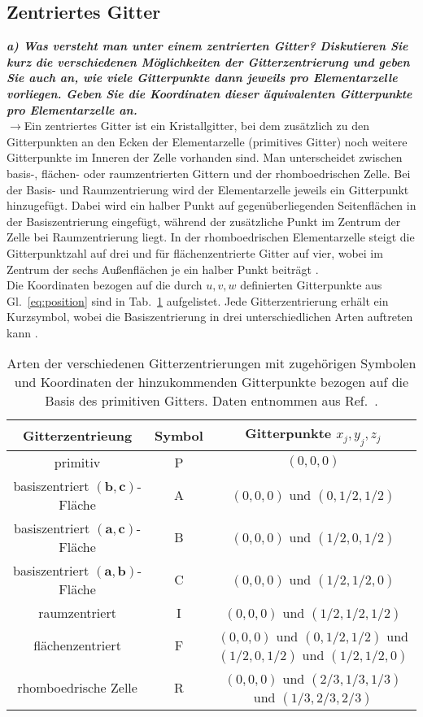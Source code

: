 \subsection{\label{subsec:FZV6}Zentriertes Gitter}
\textbf{\textit{a) Was versteht man unter einem zentrierten Gitter? 
Diskutieren Sie kurz die verschiedenen Möglichkeiten der Gitterzentrierung 
und geben Sie auch an, wie viele Gitterpunkte dann jeweils pro Elementarzelle 
vorliegen. Geben Sie die Koordinaten dieser äquivalenten Gitterpunkte 
pro Elementarzelle an.}}\\
$\rightarrow$Ein zentriertes Gitter ist ein Kristallgitter, bei dem zusätzlich zu den Gitterpunkten an den Ecken 
der Elementarzelle (primitives Gitter) noch weitere Gitterpunkte im Inneren der Zelle vorhanden sind. 
Man unterscheidet zwischen basis-, flächen- oder raumzentrierten Gittern und der rhomboedrischen Zelle. 
Bei der Basis- und Raumzentrierung wird der Elementarzelle jeweils ein Gitterpunkt hinzugefügt. 
Dabei wird ein halber Punkt auf gegenüberliegenden Seitenflächen in der Basiszentrierung eingefügt, während 
der zusätzliche Punkt im Zentrum der Zelle bei Raumzentrierung liegt. 
In der rhomboedrischen Elementarzelle steigt die Gitterpunktzahl auf drei und für flächenzentrierte Gitter auf vier, 
wobei im Zentrum der sechs Außenflächen je ein halber Punkt beiträgt \cite{Schwarz, EPC}. \\ 
Die Koordinaten bezogen auf die durch $u,v,w$ definierten Gitterpunkte aus Gl.~\ref{eq:position} sind in Tab.~\ref{tab:zent} 
aufgelistet. Jede Gitterzentrierung erhält ein Kurzsymbol, wobei die Basiszentrierung in drei unterschiedlichen Arten auftreten kann \cite{Schwarz}.
\begin{table}[h!]
    \centering
    \caption{\label{tab:zent}Arten der verschiedenen Gitterzentrierungen mit zugehörigen Symbolen und Koordinaten der hinzukommenden Gitterpunkte
    bezogen auf die Basis des primitiven Gitters. Daten entnommen aus Ref.~\cite{Schwarz}.}
      \begin{tabular}{c|c|c}
      \rowcolor[rgb]{ .851,  .882,  .949} Gitterzentrieung & Symbol & Gitterpunkte $x_{j}, y_{j}, z_{j}$ \\
      \midrule
      \midrule
      primitiv & P     & $(0,0,0)$ \\
      basiszentriert $(\mathbf{b},\mathbf{c})$-Fläche & A     & $(0,0,0)$ und $(0, 1/2, 1/2)$ \\
      basiszentriert $(\mathbf{a},\mathbf{c})$-Fläche & B     & $(0,0,0)$ und $(1/2, 0, 1/2)$ \\
      basiszentriert $(\mathbf{a},\mathbf{b})$-Fläche & C     & $(0,0,0)$ und $(1/2, 1/2, 0)$ \\
      raumzentriert & I     & $(0,0,0)$ und $(1/2, 1/2, 1/2)$ \\
      flächenzentriert & F     & $(0,0,0)$ und $(0, 1/2, 1/2)$ und $(1/2, 0, 1/2)$ und $(1/2, 1/2, 0)$ \\
      rhomboedrische Zelle & R     & $(0,0,0)$ und $(2/3, 1/3, 1/3)$ und $(1/3, 2/3, 2/3)$ \\
      \end{tabular}
\end{table}\FloatBarrier \,\\

